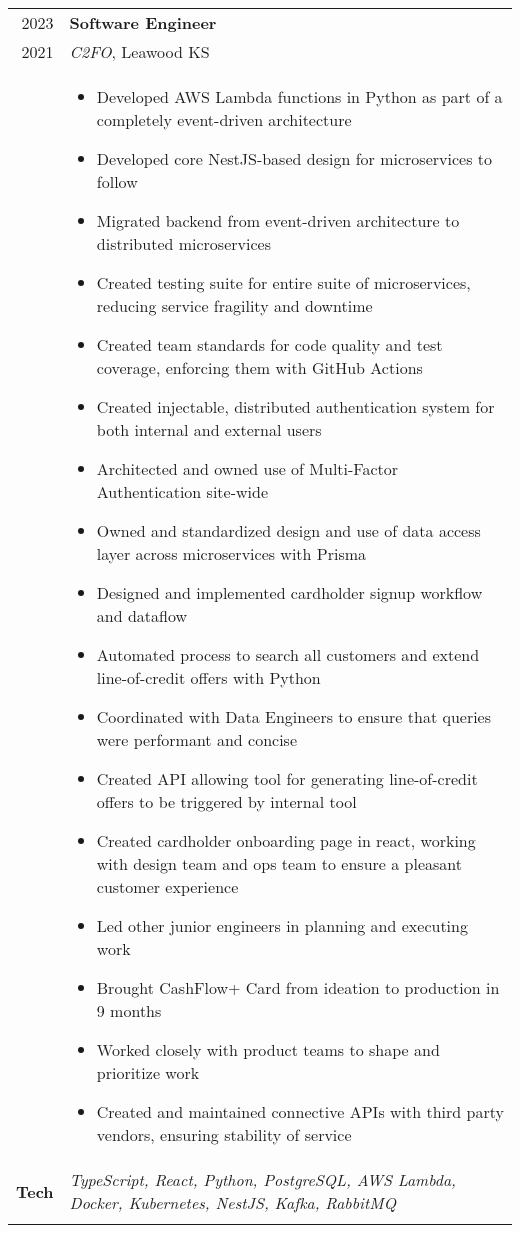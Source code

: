 \documentclass[a4paper,10pt]{article}
\newcommand{\br}{\\\multicolumn{2}{c}{}}
\begin{document}
\begin{tabular}{r p{15cm}}
  \textsc{2023} & \textbf{Software Engineer} \\
  \textsc{2021} & \textit{C2FO}, Leawood KS
  \\ &  
       \begin{itemize}
       \item Developed AWS Lambda functions in Python as part of a completely event-driven architecture
       \item Developed core NestJS-based design for microservices to follow
       \item Migrated backend from event-driven architecture to distributed microservices
       \item Created testing suite for entire suite of microservices, reducing service fragility and downtime
       \item Created team standards for code quality and test coverage, enforcing them with GitHub Actions
       \item Created injectable, distributed authentication system for both internal and external users
       \item Architected and owned use of Multi-Factor Authentication site-wide
       \item Owned and standardized design and use of data access layer across microservices with Prisma
       \item Designed and implemented cardholder signup workflow and dataflow
       \item Automated process to search all customers and extend line-of-credit offers with Python
       \item Coordinated with Data Engineers to ensure that queries were performant and concise
       \item Created API allowing tool for generating line-of-credit offers to be triggered by internal tool
       \item Created cardholder onboarding page in react, working with design team and ops team to ensure a pleasant customer experience
       \item Led other junior engineers in planning and executing work
       \item Brought CashFlow+ Card from ideation to production in 9 months
       \item Worked closely with product teams to shape and prioritize work
       \item Created and maintained connective APIs with third party vendors, ensuring stability of service
       \end{itemize} \\
  \textbf{Tech} & \textit{TypeScript, React, Python, PostgreSQL, AWS Lambda, Docker, Kubernetes, NestJS, Kafka, RabbitMQ} \br \\
\end{tabular}
\end{document}
